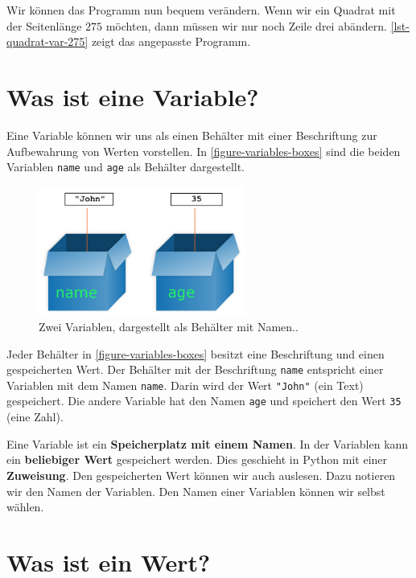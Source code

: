 Wir können das Programm nun bequem verändern. Wenn wir ein Quadrat mit der Seitenlänge $275$ möchten, dann müssen wir nur noch Zeile drei abändern. \autoref{lst-quadrat-var-275} zeigt das angepasste Programm.

\section{Was ist eine Variable?}

Eine Variable können wir uns als einen Behälter mit einer Beschriftung zur Aufbewahrung von Werten vorstellen. In \autoref{figure-variables-boxes} sind die beiden Variablen \lstinline{name} und \lstinline{age} als Behälter dargestellt.

\begin{figure}[htb]
\centering
\includegraphics[height=4.25cm]{boxesVariable}
\caption{Zwei Variablen, dargestellt als Behälter mit Namen.\protect\footnotemark.}
\label{figure-variables-boxes}
\end{figure}


Jeder Behälter in \autoref{figure-variables-boxes} besitzt eine Beschriftung und einen gespeicherten Wert. Der Behälter mit der Beschriftung \lstinline{name} entspricht einer Variablen mit dem Namen \lstinline{name}. Darin wird der Wert \lstinline{"John"} (ein Text) gespeichert. Die andere Variable hat den Namen \lstinline{age} und speichert den Wert \lstinline{35} (eine Zahl).

\begin{definition}[Variable]
Eine Variable ist ein \textbf{Speicherplatz mit einem Namen}. In der Variablen kann ein \textbf{beliebiger Wert} gespeichert werden. Dies geschieht in Python mit einer \textbf{Zuweisung}. Den gespeicherten Wert können wir auch auslesen. Dazu notieren wir den Namen der Variablen. Den Namen einer Variablen können wir selbst wählen.
\end{definition}

\section{Was ist ein Wert?}

